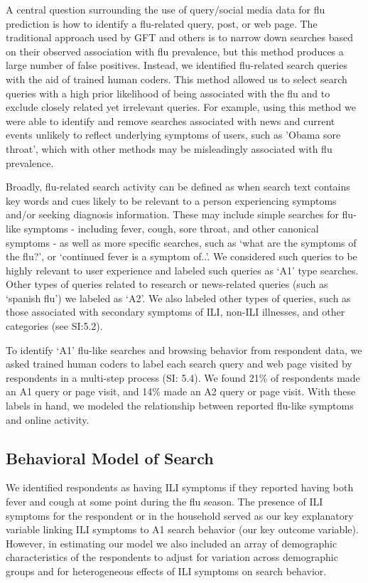 \documentclass[fleqn,10pt]{wlscirep}
\begin{document}
A central question surrounding the use of query/social media data for flu prediction is how to identify a flu-related query, post, or web page. The traditional approach used by GFT and others is to narrow down searches based on their observed association with flu prevalence, but this method produces a large number of false positives. Instead, we identified flu-related search queries with the aid of trained human coders. This method allowed us to select search queries with a high prior likelihood of being associated with the flu and to exclude closely related yet irrelevant queries. For example, using this method we were able to identify and remove searches associated with news and current events unlikely to reflect underlying symptoms of users, such as 'Obama sore throat', which with other methods may be misleadingly associated with flu prevalence.

Broadly, flu-related search activity can be defined as when search text contains key words and cues likely to be relevant to a person experiencing symptoms and/or seeking diagnosis information. These may include simple searches for flu-like symptoms - including fever, cough, sore throat, and other canonical symptoms - as well as more specific searches, such as `what are the symptoms of the flu?', or `continued fever is a symptom of..'. We considered such queries to be highly relevant to user experience and labeled such queries as `A1' type searches. Other types of queries related to research or news-related queries (such as `spanish flu') we labeled as `A2'. We also labeled other types of queries, such as those associated with secondary symptoms of ILI, non-ILI illnesses, and other categories (see SI:5.2).

To identify `A1' flu-like searches and browsing behavior from respondent data, we asked trained human coders to label each search query and web page visited by respondents in a multi-step process (SI: 5.4). We found 21\% of respondents made an A1 query or page visit, and 14\% made an A2 query or page visit. With these labels in hand, we modeled the relationship between reported flu-like symptoms and online activity.

\subsection*{Behavioral Model of Search}

We identified respondents as having ILI symptoms if they reported having both fever and cough at some point during the flu season. The presence of ILI symptoms for the respondent or in the household served as our key explanatory variable linking ILI symptoms to A1 search behavior (our key outcome variable). However, in estimating our model we also included an array of demographic characteristics of the respondents to adjust for variation across demographic groups and for heterogeneous effects of ILI symptoms on search behavior.
\end{document}
